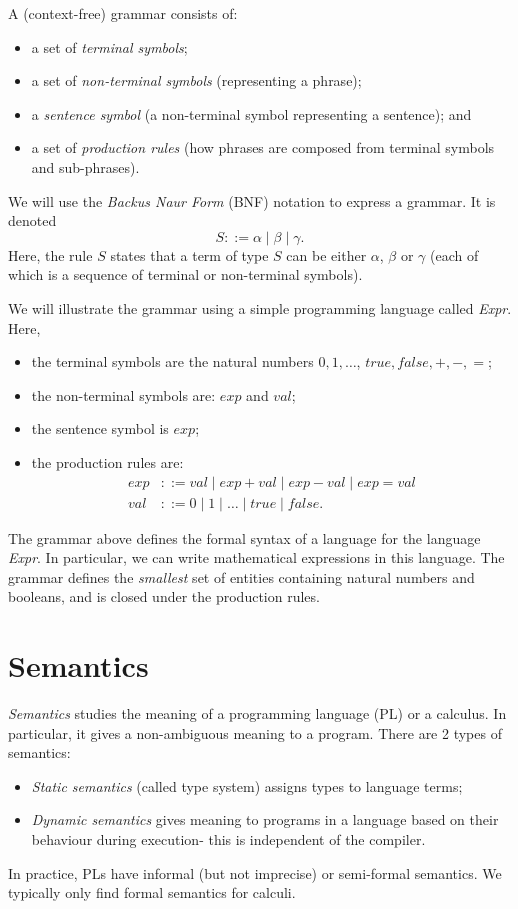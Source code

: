\documentclass[a4paper, openany]{memoir}
\begin{document}
    A (context-free) grammar consists of:
    \begin{itemize}
        \item a set of \emph{terminal symbols};
        \item a set of \emph{non-terminal symbols} (representing a phrase);
        \item a \emph{sentence symbol} (a non-terminal symbol representing a sentence); and
        \item a set of \emph{production rules} (how phrases are composed from terminal symbols and sub-phrases).
    \end{itemize}

    We will use the \emph{Backus Naur Form} (BNF) notation to express a grammar. It is denoted
    \[S ::= \alpha \mid \beta \mid \gamma.\]
    Here, the rule $S$ states that a term of type $S$ can be either $\alpha$, $\beta$ or $\gamma$ (each of which is a sequence of terminal or non-terminal symbols).

    We will illustrate the grammar using a simple programming language called \textit{Expr}. Here,
    \begin{itemize}
        \item the terminal symbols are the natural numbers $0, 1, \dots$, $\textit{true}, \textit{false}, +, -, =$;
        \item the non-terminal symbols are: $exp$ and $val$;
        \item the sentence symbol is $exp$;
        \item the production rules are:
        \begin{align*}
            exp &::= val \mid exp + val \mid exp - val \mid exp = val \\
            val &::= 0 \mid 1 \mid \dots \mid \textit{true} \mid \textit{false}.
        \end{align*}
    \end{itemize}
    The grammar above defines the formal syntax of a language for the language \textit{Expr}. In particular, we can write mathematical expressions in this language. The grammar defines the \emph{smallest} set of entities containing natural numbers and booleans, and is closed under the production rules.
    \newpage

    \section{Semantics}
    \emph{Semantics} studies the meaning of a programming language (PL) or a calculus. In particular, it gives a non-ambiguous meaning to a program. There are 2 types of semantics:
    \begin{itemize}
        \item \emph{Static semantics} (called type system) assigns types to language terms;
        \item \emph{Dynamic semantics} gives meaning to programs in a language based on their behaviour during execution- this is independent of the compiler.
    \end{itemize}
    In practice, PLs have informal (but not imprecise) or semi-formal semantics. We typically only find formal semantics for calculi.
\end{document}
